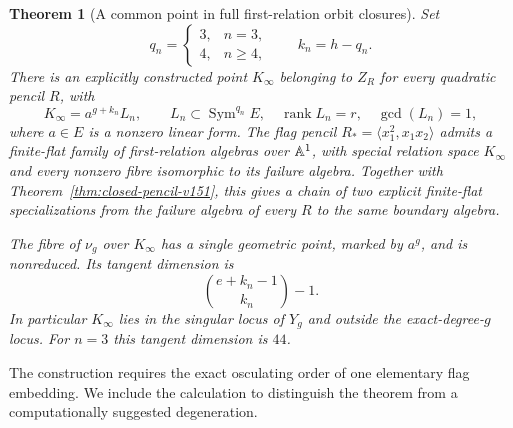 \documentclass[11pt,reqno]{amsart}
\numberwithin{equation}{section}
\newtheorem{theorem}{Theorem}[section]
\theoremstyle{definition}\newtheorem{definition}[theorem]{Definition}
\theoremstyle{remark}\newtheorem{remark}[theorem]{Remark}
\DeclareMathOperator{\Sym}{Sym}\DeclareMathOperator{\Gr}{Gr}
\DeclareMathOperator{\rank}{rank}\DeclareMathOperator{\Proj}{Proj}
\begin{document}
\begin{theorem}[A common point in full first-relation orbit closures]
\label{thm:universal-boundary-v152}
Set
\[
 q_n=\begin{cases}3,&n=3,\\4,&n\geq4,\end{cases}
 \qquad k_n=h-q_n.
\]
There is an explicitly constructed point $K_\infty$ belonging to
$Z_R$ for every quadratic pencil $R$, with
\begin{equation}\label{eq:boundary-gcd-v152}
 K_\infty=a^{g+k_n}L_n,\qquad
 L_n\subset\Sym^{q_n}E,\quad \rank L_n=r,\quad\gcd(L_n)=1,
\end{equation}
where $a\in E$ is a nonzero linear form.  The flag pencil
$R_*=\langle x_1^2,x_1x_2\rangle$ admits a finite-flat family of
first-relation algebras over $\mathbb A^1$, with special relation space
$K_\infty$ and every nonzero fibre isomorphic to its failure algebra.
Together with Theorem~\ref{thm:closed-pencil-v151}, this gives a
chain of two explicit finite-flat specializations from the failure
algebra of every $R$ to the same boundary algebra.

The fibre of $\nu_g$ over $K_\infty$ has a single geometric point,
marked by $a^g$, and is nonreduced.  Its tangent dimension is
\begin{equation}\label{eq:boundary-tangent-v152}
                 \binom{e+k_n-1}{k_n}-1.
\end{equation}
In particular $K_\infty$ lies in the singular locus of $Y_g$ and
outside the exact-degree-$g$ locus.  For $n=3$ this tangent dimension
is $44$.
\end{theorem}

The construction requires the exact osculating order of one elementary
flag embedding.  We include the calculation to distinguish the theorem
from a computationally suggested degeneration.
\end{document}

